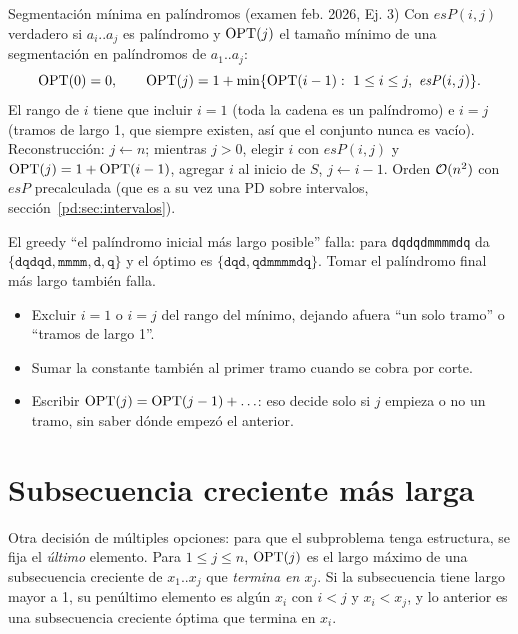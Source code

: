 \begin{problema}{Segmentación mínima en palíndromos (examen feb. 2026, Ej. 3)}
Con $\mathit{esP}(i,j)$ verdadero si $a_i..a_j$ es palíndromo y $\mathrm{OPT}(j)$ el tamaño
mínimo de una segmentación en palíndromos de $a_1..a_j$:
\[
\mathrm{OPT}(0)=0,\qquad \mathrm{OPT}(j)=1+\min\{\mathrm{OPT}(i-1):\ 1\le i\le j,\ \mathit{esP}(i,j)\}.
\]
El rango de $i$ tiene que incluir $i=1$ (toda la cadena es un palíndromo) e
$i=j$ (tramos de largo 1, que siempre existen, así que el conjunto nunca es
vacío). Reconstrucción: $j\gets n$; mientras $j>0$, elegir $i$ con
$\mathit{esP}(i,j)$ y $\mathrm{OPT}(j)=1+\mathrm{OPT}(i-1)$, agregar $i$ al inicio de $S$,
$j\gets i-1$. Orden $\mathcal{O}(n^2)$ con $\mathit{esP}$ precalculada (que es a su vez una
PD sobre intervalos, sección~\ref{pd:sec:intervalos}).

El greedy ``el palíndromo inicial más largo posible'' falla: para
\texttt{dqdqdmmmmdq} da $\{\texttt{dqdqd},\texttt{mmmm},\texttt{d},\texttt{q}\}$
y el óptimo es $\{\texttt{dqd},\texttt{qdmmmmdq}\}$. Tomar el palíndromo
final más largo también falla.
\end{problema}

\begin{trampa}[segmentación]
\begin{itemize}[leftmargin=1.2em]
  \item Excluir $i=1$ o $i=j$ del rango del mínimo, dejando afuera ``un solo
  tramo'' o ``tramos de largo 1''.
  \item Sumar la constante también al primer tramo cuando se cobra por corte.
  \item Escribir $\mathrm{OPT}(j)=\mathrm{OPT}(j-1)+\ldots$: eso decide solo si $j$ empieza o
  no un tramo, sin saber dónde empezó el anterior.
\end{itemize}
\end{trampa}

\section{Subsecuencia creciente más larga}

Otra decisión de múltiples opciones: para que el subproblema tenga
estructura, se fija el \emph{último} elemento. Para $1\le j\le n$,
$\mathrm{OPT}(j)$ es el largo máximo de una subsecuencia creciente de $x_1..x_j$ que
\emph{termina en $x_j$}. Si la subsecuencia tiene largo mayor a 1, su
penúltimo elemento es algún $x_i$ con $i<j$ y $x_i<x_j$, y lo anterior es una
subsecuencia creciente óptima que termina en $x_i$.

